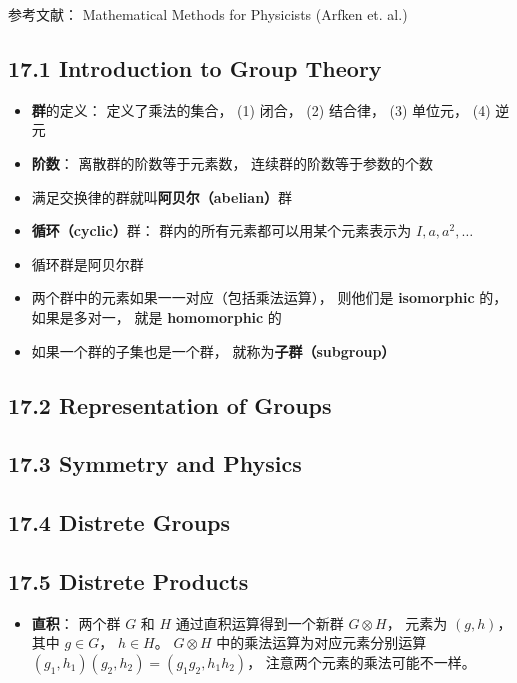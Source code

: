
\begin{issues}
\issueDraft
\end{issues}

参考文献： Mathematical Methods for Physicists (Arfken et. al.)

\subsection{17.1 Introduction to Group Theory}
\begin{itemize}
\item \textbf{群}的定义： 定义了乘法的集合， (1) 闭合， (2) 结合律， (3) 单位元， (4) 逆元

\item \textbf{阶数}： 离散群的阶数等于元素数， 连续群的阶数等于参数的个数

\item 满足交换律的群就叫\textbf{阿贝尔（abelian）}群

\item \textbf{循环（cyclic）}群： 群内的所有元素都可以用某个元素表示为 $I, a, a^2, \dots$

\item 循环群是阿贝尔群

\item 两个群中的元素如果一一对应（包括乘法运算）， 则他们是 \textbf{isomorphic} 的， 如果是多对一， 就是 \textbf{homomorphic} 的

\item 如果一个群的子集也是一个群， 就称为\textbf{子群（subgroup）}
\end{itemize}

\subsection{17.2 Representation of Groups}

\subsection{17.3 Symmetry and Physics}

\subsection{17.4 Distrete Groups}

\subsection{17.5 Distrete Products}
\begin{itemize}
\item \textbf{直积}： 两个群 $G$ 和 $H$ 通过直积运算得到一个新群 $G \otimes H$， 元素为 $(g, h)$， 其中 $g\in G$， $h\in H$。 $G \otimes H$ 中的乘法运算为对应元素分别运算 $(g_1, h_1)(g_2, h_2) = (g_1 g_2, h_1 h_2)$， 注意两个元素的乘法可能不一样。
\end{itemize}

